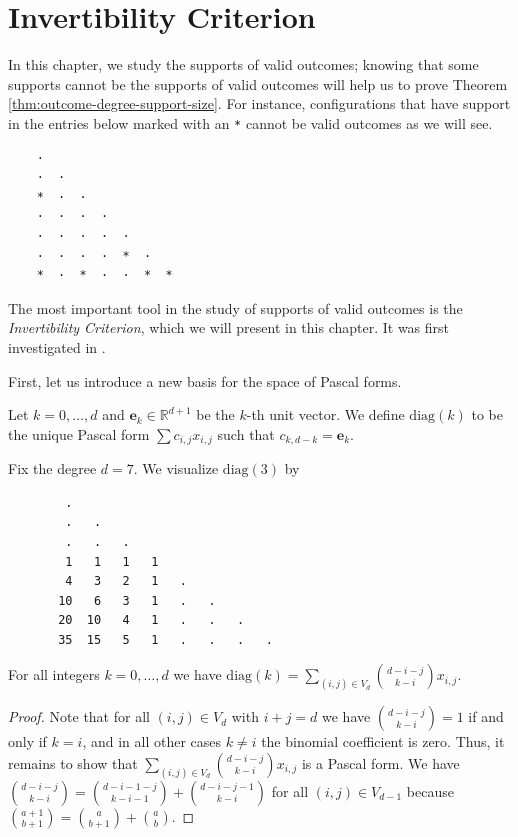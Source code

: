 \chapter{Invertibility Criterion}

In this chapter, we study the supports of valid outcomes; knowing that some supports cannot be the supports of valid outcomes will help us to prove Theorem \ref{thm:outcome-degree-support-size}. For instance, configurations that have support in the entries below marked with an \texttt{*} cannot be valid outcomes as we will see.
\begin{verbatim}
    ·  
    ·  · 
    *  ·  · 
    ·  ·  ·  · 
    ·  ·  ·  ·  · 
    ·  ·  ·  ·  *  · 
    *  ·  *  ·  ·  *  *
\end{verbatim}
The most important tool in the study of supports of valid outcomes is the \emph{Invertibility Criterion}, which we will present in this chapter. It was first investigated in \cite{bik2022classifying}. 

First, let us introduce a new basis for the space of Pascal forms.

\begin{definition}
    Let \( k = 0, \dots, d \) and \( \mathbf e_k \in \mathbb{R}^{d+1} \) be the \( k \)-th unit vector. We define \( \mathrm{diag}(k) \) to be the unique Pascal form \( \sum c_{i,j}x_{i,j} \) such that \( c_{k,d-k} = \mathbf e_k \).
\end{definition}

\begin{example}
    Fix the degree \( d = 7 \). We visualize \( \mathrm{diag}(3) \) by
    \begin{verbatim}
        .
        .   .
        .   .   .
        1   1   1   1
        4   3   2   1   .
       10   6   3   1   .   .
       20  10   4   1   .   .   . 
       35  15   5   1   .   .   .   .
    \end{verbatim}
\end{example}

\begin{proposition}\label{prop:diagonal-basis-324324324231}
    For all integers \( k = 0, \dots, d \) we have \( \mathrm{diag}(k)  = \sum_{(i,j) \in V_d}\binom{d - i - j}{k-i} x_{i,j} \).
\end{proposition}

\begin{proof}
    Note that for all \( (i,j) \in V_d \) with \( i+j = d \) we have \( \binom{d - i - j}{k-i} = 1 \) if and only if \( k= i \), and in all other cases \( k \neq i \) the binomial coefficient is zero. Thus, it remains to show that \( \sum_{(i,j) \in V_d}\binom{d - i - j}{k-i} x_{i,j} \) is a Pascal form. We have \(  \binom{d-i-j}{k-i} = \binom{d-i-1-j}{k-i-1} + \binom{d-i-j-1}{k-i} \)
    for all \( (i,j) \in V_{d-1} \) because \( \binom{a+1}{b+1} = \binom{a}{b+1} + \binom{a}{b}\).
\end{proof}

